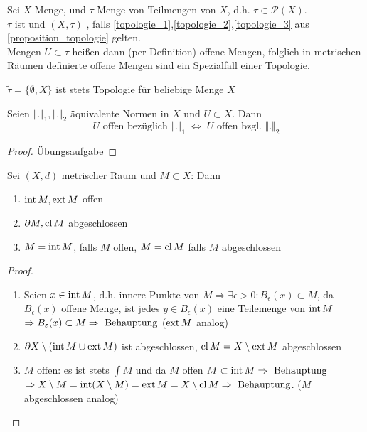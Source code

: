 \begin{*definition}[Topologie]
	Sei $X$ Menge, und $\tau$ Menge von Teilmengen von $X$, d.h. $\tau\subset\mathcal{P}(X)$.\\
	$\tau$ ist  und $(X,\tau)$ , falls \ref{topologie_1},\ref{topologie_2},\ref{topologie_3} aus \ref{proposition_topologie} gelten. \\
	Mengen $U\subset\tau$ heißen dann (per Definition) offene Mengen, folglich in metrischen Räumen definierte offene Mengen sind ein Spezialfall einer Topologie. \\
	\begin{underlinedenvironment}[beachte]
		$\tilde{\tau}=\{\emptyset, X\}$ ist stets Topologie für beliebige Menge $X$
	\end{underlinedenvironment}
\end{*definition}

\begin{proposition}
	Seien $\Vert.\Vert_1, \Vert.\Vert_2$ äquivalente Normen in $X$ und $U\subset X$. Dann \[ U\text{ offen bezüglich } \Vert .\Vert_1\; \Leftrightarrow\; U\text{ offen bzgl. } \Vert .\Vert_2 \]
\end{proposition}
\begin{proof}
	Übungsaufgabe
\end{proof}

\begin{proposition}
	Sei $(X,d)$ metrischer Raum und $M\subset X$: Dann
	\begin{enumerate}[label={\arabic*)}]
		\item $\operatorname{int} M, \operatorname{ext} M$ offen
		\item $\partial M, \operatorname{cl} M$ abgeschlossen
		\item $M = \operatorname{int} M$, falls $M$ offen, $M=\operatorname{cl} M$ falls $M$ abgeschlossen
	\end{enumerate}
\end{proposition}
\begin{proof}
	\begin{enumerate}[label={\arabic*)}]
		\item Seien $x \in \operatorname{int} M$, d.h. innere Punkte von $M \Rightarrow \exists \epsilon > 0 \colon B_{\epsilon}(x) \subset M$, da $B_{\epsilon}(x)$ offene Menge, ist jedes $y \in B_{\epsilon}(x)$ eine Teilemenge von $\operatorname{int} M$ $\Rightarrow B_{\varepsilon}(x) \subset M \Rightarrow \text{ Behauptung}$ ($\operatorname{ext} M$ analog)
		\item $\partial X\setminus (\operatorname{int} M \cup \operatorname{ext} M)$ ist abgeschlossen, $\operatorname{cl} M = X\setminus\operatorname{ext} M$ abgeschlossen
		\item $M$ offen: es ist stets $\int M$ und da $M$ offen $M \subset \operatorname{int} M \Rightarrow \text{ Behauptung}$  $\Rightarrow X\setminus M = \operatorname{int}(X\setminus M) = \operatorname{ext} M = X \setminus \operatorname{cl} M \Rightarrow \text{ Behauptung}$.
		($M$ abgeschlossen analog)
	\end{enumerate}
\end{proof}